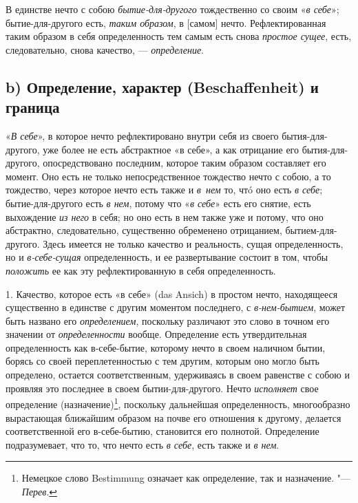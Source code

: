 В единстве нечто с собою {\em бытие-для-другого}
тождественно со своим «{\em в себе}»; бытие-для-другого
есть, {\em таким образом}, в [самом] нечто.
Рефлектированная таким образом в себя определенность тем самым есть снова
{\em простое сущее}, есть, следовательно, снова
качество, — {\em определение}.

\subsection*{b) Определение, характер (Beschaffenheit) и граница}
«{\em В себе}», в которое нечто рефлектировано внутри
себя из своего бытия-для-другого, уже более не есть абстрактное «в себе», а
как отрицание его бытия-для-другого, опосредствовано последним, которое
таким образом составляет его момент. Оно есть не только непосредственное
тождество нечто с собою, а то тождество, через которое нечто есть также и
{\em в~нем} то, чтó оно есть {\em в
себе}; бытие-для-другого есть {\em в нем}, потому что
«{\em в себе}» есть его снятие, есть выхождение
{\em из него} в себя; но оно есть в нем также уже и
потому, что оно абстрактно, следовательно, существенно обременено
отрицанием, бытием-для-другого. Здесь имеется не только качество и
реальность, сущая определенность, но и
{\em в-себе-сущая} определенность, и ее развертывание
состоит в том, чтобы {\em положить} ее как эту
рефлектированную в себя определенность.

1. Качество, которое есть «в себе» (das Ansich) в простом нечто, находящееся
существенно в единстве с другим моментом последнего, с
{\em в-нем-бытием}, может быть названо его
{\em определением}, поскольку различают это слово в
точном его значении от {\em определенности} вообще.
Определение есть утвердительная определенность как в-себе-бытие, которому
нечто в своем наличном бытии, борясь со своей переплетенностью с тем
другим, которым оно могло быть определено, остается соответственным,
удерживаясь в своем равенстве с собою и проявляя это последнее в своем
бытии-для-другого. Нечто {\em исполняет} свое
определение (назначение)\footnote{Немецкое слово Bestimmung
означает как определение, так и назначение. "--- {\em Перев}.},
поскольку дальнейшая определенность,
многообразно вырастающая ближайшим образом на почве его отношения к
другому, делается соответственной его в-себе-бытию, становится его
полнотой. Определение подразумевает, что то, что нечто есть
{\em в себе}, есть также и {\em в
нем}.

